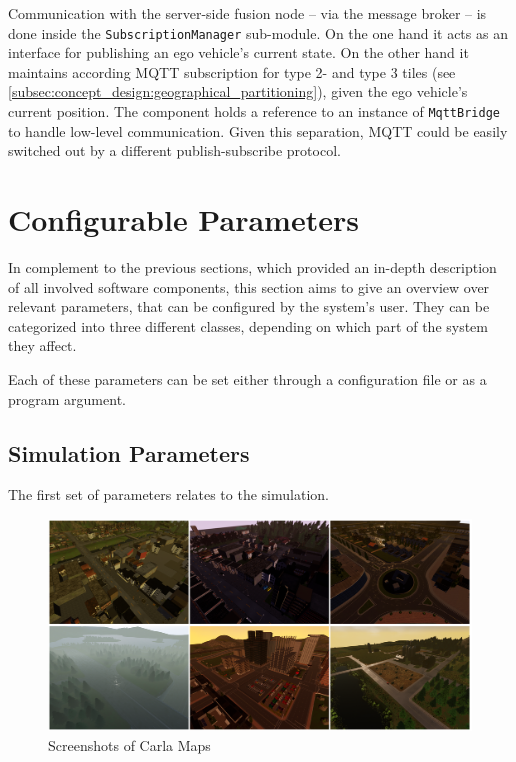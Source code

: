 Communication with the server-side fusion node – via the message broker – is done inside the \texttt{SubscriptionManager} sub-module. On the one hand it acts as an interface for publishing an ego vehicle's current state. On the other hand it maintains according MQTT subscription for type 2- and type 3 tiles (see \cref{subsec:concept_design:geographical_partitioning}), given the ego vehicle's current position. The component holds a reference to an instance of \texttt{MqttBridge} to handle low-level communication. Given this separation, MQTT could be easily switched out by a different publish-subscribe protocol. 

\section{Configurable Parameters}
\label{sec:implementation:configurable_parameters}
In complement to the previous sections, which provided an in-depth description of all involved software components, this section aims to give an overview over relevant parameters, that can be configured by the system's user. They can be categorized into three different classes, depending on which part of the system they affect.

Each of these parameters can be set either through a configuration file or as a program argument.

\subsection{Simulation Parameters}
\label{subsec:implementation:simulation_parameters}
The first set of parameters relates to the simulation.

\begin{figure}
	\centering
	\includegraphics[width=1.0\linewidth]{98_images/carla_collage}
	\caption{Screenshots of Carla Maps}
	\label{fig:carla_collage}
\end{figure}


